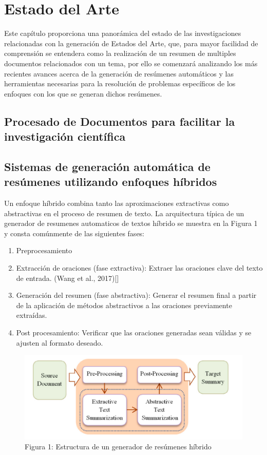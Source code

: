 \chapter{Estado del Arte}\label{chapter:state-of-the-art}
    Este capítulo proporciona una panorámica del estado de las investigaciones relacionadas con la generación de Estados del Arte, que, para mayor facilidad de comprensión se entendera como la realización de un resumen de multiples documentos relacionados con un tema, por ello se comenzará analizando los más recientes avances acerca de la generación de resúmenes automáticos y las herramientas necesarias para la resolución de problemas específicos de los enfoques con los que se generan dichos resúmenes.
\section{Procesado de Documentos para facilitar la investigación científica}


\section{Sistemas de generación automática de resúmenes utilizando enfoques híbridos}

Un enfoque híbrido combina tanto las aproximaciones extractivas como abstractivas en el proceso de resumen de texto. La arquitectura típica  de un generador de resumenes automaticos de textos híbrido se muestra en la Figura 1 y consta comúnmente de las siguientes fases:

\begin{enumerate}
    \item Preprocesamiento
    \item Extracción de oraciones (fase extractiva): Extraer las oraciones clave del texto de entrada. (Wang et al., 2017)[\cite{Wang}]
    \item Generación del resumen (fase abstractiva): Generar el resumen final a partir de la aplicación de métodos abstractivos a las oraciones previamente extraídas.
    \item Post procesamiento: Verificar que las oraciones generadas sean válidas y se ajusten al formato deseado.
\end{enumerate}

\begin{figure}[H]    
    \centering
    \includegraphics[scale = 1]{Figures/hybrid.png}
    \caption*{Figura 1: Estructura de un generador de resúmenes híbrido}
\end{figure}

